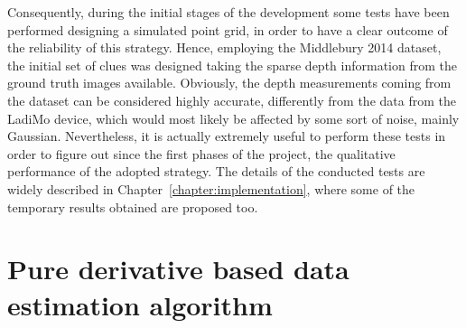 Consequently, during the initial stages of the development some tests have been performed designing a simulated point grid, in order to have a clear outcome of the reliability of this strategy.
Hence, employing the Middlebury 2014 dataset, the initial set of clues was designed taking the sparse depth information from the ground truth images available. 
Obviously, the depth measurements coming from the dataset can be considered highly accurate, differently from the data from the LadiMo device, which would most likely be affected by some sort of noise, mainly Gaussian. 
Nevertheless, it is actually extremely useful to perform these tests in order to figure out since the first phases of the project, the qualitative performance of the adopted strategy.
The details of the conducted tests are widely described in Chapter~\ref{chapter:implementation}, where some of the temporary results obtained are proposed too.\\


\section{Pure derivative based data estimation algorithm}
\label{section:deriv-based-algorithm}

